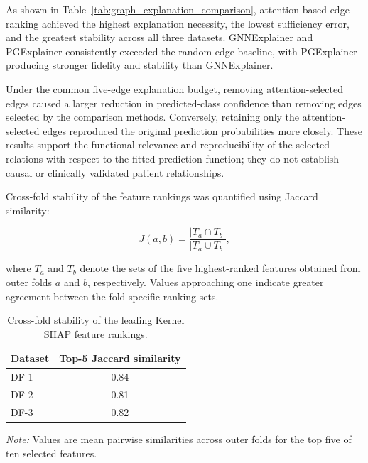 \documentclass[pdflatex,sn-mathphys-num]{sn-jnl}%
\theoremstyle{thmstyleone}%
\theoremstyle{thmstyletwo}%
\theoremstyle{thmstylethree}%
\begin{document}
As shown in Table~\ref{tab:graph_explanation_comparison}, attention-based edge
ranking achieved the highest explanation necessity, the lowest sufficiency
error, and the greatest stability across all three datasets. GNNExplainer and
PGExplainer consistently exceeded the random-edge baseline, with PGExplainer
producing stronger fidelity and stability than GNNExplainer.

 {
Under the common five-edge explanation budget, removing attention-selected
edges caused a larger reduction in predicted-class confidence than removing
edges selected by the comparison methods. Conversely, retaining only the
attention-selected edges reproduced the original prediction probabilities
more closely. These results support the functional relevance and
reproducibility of the selected relations with respect to the fitted
prediction function; they do not establish causal or clinically validated
patient relationships.
}

Cross-fold stability of the feature rankings was quantified using Jaccard
similarity:

\begin{equation}
J(a,b)
=
\frac{
\left|T_a\cap T_b\right|
}{
\left|T_a\cup T_b\right|
},
\label{eq:jaccard_stability}
\end{equation}

where \(T_a\) and \(T_b\) denote the sets of the five highest-ranked features
obtained from outer folds \(a\) and \(b\), respectively. Values approaching
one indicate greater agreement between the fold-specific ranking sets.

\begin{table}[!ht]
\centering
\caption{
Cross-fold stability of the leading Kernel SHAP feature rankings.
}
\label{tab:explanation_stability}
\small
\setlength{\tabcolsep}{10pt}
\renewcommand{\arraystretch}{1.06}
\begin{tabular}{@{}lc@{}}
\toprule
\textbf{Dataset} &
\textbf{Top-5 Jaccard similarity} \\
\midrule
DF-1 & 0.84 \\
DF-2 & 0.81 \\
DF-3 & 0.82 \\
\bottomrule
\end{tabular}

\vspace{2pt}
\begin{minipage}{0.94\linewidth}
\footnotesize
\textit{Note:} Values are mean pairwise similarities across outer folds for
the top five of ten selected features.
\end{minipage}
\end{table}
\end{document}
